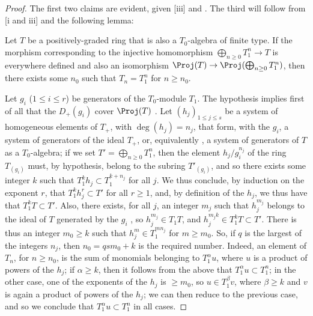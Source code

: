 \begin{proof}
The first two claims are evident, given [iii] and .
The third will follow from [i and iii] and the following lemma:
\begin{lemma}[8.2.14.1]
\label{II.8.2.14.1}
Let $T$ be a positively-graded ring that is also a $T_0$-algebra of finite type.
If the morphism corresponding to the injective homomorphism $\bigoplus_{n\geq0}T_1^n\to T$ is everywhere defined and also an isomorphism $\Proj(T)\to\Proj(\bigoplus_{n\geq0}T_1^n)$, then there exists some $n_0$ such that $T_n=T_1^n$ for $n\geq n_0$.
\end{lemma}

Let $g_i$ ($1\leq i\leq r$) be generators of the $T_0$-module $T_1$.
The hypothesis implies first of all that the $D_+(g_i)$ cover $\Proj(T)$ .
Let $(h_j)_{1\leq j\leq s}$ be a system of homogeneous elements of $T_+$, with $\deg(h_j)=n_j$, that form, with the $g_i$, a system of generators of the ideal $T_+$, or, equivalently , a system of generators of $T$ as a $T_0$-algebra;
if we set $T'=\bigoplus_{n\geq0}T_1^n$, then the element $h_j/g_i^{n_j}$ of the ring $T_{(g_i)}$ must, by hypothesis, belong to the subring $T'_{(g_i)}$, and so there exists some integer $k$ such that $T_1^k h_j\subset T_1^{k+n_j}$ for all $j$.
We thus conclude, by induction on the exponent $r$, that $T_1^k h_j^r \subset T'$ for all $r\geq1$, and, by definition of the $h_j$, we thus have that $T_1^k T\subset T'$.
Also, there exists, for all $j$, an integer $m_j$ such that $h_j^{m_j}$ belongs to the ideal of $T$ generated by the $g_i$ , so $h_j^{m_j}\in T_1 T$, and
$h_j^{m_j k}\in T_1^k T\subset T'$.
There is thus an integer $m_0\geq k$ such that $h_j^m\in T_1^{m n_j}$ for $m\geq m_0$.
So, if $q$ is the largest of the integers $n_j$, then $n_0=q s m_0+k$ is the required number.
Indeed, an element of $T_n$, for $n\geq n_0$, is the sum of monomials belonging to $T_1^\alpha u$, where $u$ is a product of powers of the $h_j$;
if $\alpha\geq k$, then it follows from the above that $T_1^\alpha u\subset T_1^n$;
in the other case, one of the exponents of the $h_j$ is $\geq m_0$, so $u\in T_1^\beta v$, where $\beta\geq k$ and $v$ is again a product of powers of the $h_j$;
we can then reduce to the previous case, and so we conclude that $T_1^\alpha u\subset T_1^n$ in all cases.
\end{proof}

